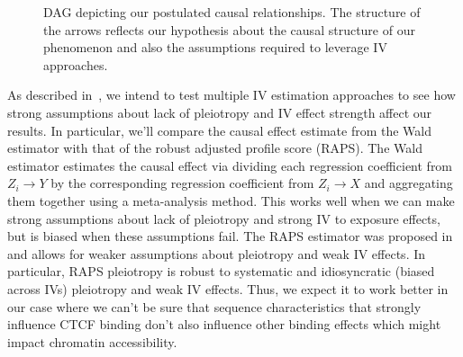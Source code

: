 \documentclass{article}
\begin{document}
\begin{figure}[ht]

    \caption{DAG depicting our postulated causal relationships. The structure of the arrows reflects our hypothesis about the causal structure of our phenomenon and also the assumptions required to leverage IV approaches.}
    \label{fig:mr_iv_dag}
\end{figure}

As described in~\cite{zhao2018statistical}, we intend to test multiple IV estimation approaches to see how strong assumptions about lack of pleiotropy and IV effect strength affect our results. In particular, we'll compare the causal effect estimate from the Wald estimator with that of the robust adjusted profile score (RAPS). The Wald estimator estimates the causal effect via dividing each regression coefficient from \( Z_i \rightarrow Y \) by the corresponding regression coefficient from \( Z_i \rightarrow X \) and aggregating them together using a meta-analysis method. This works well when we can make strong assumptions about lack of pleiotropy and strong IV to exposure effects, but is biased when these assumptions fail. The RAPS estimator was proposed in~\cite{zhao2018statistical} and allows for weaker assumptions about pleiotropy and weak IV effects. In particular, RAPS pleiotropy is robust to systematic and idiosyncratic (biased across IVs) pleiotropy and weak IV effects. Thus, we expect it to work better in our case where we can't be sure that sequence characteristics that strongly influence CTCF binding don't also influence other binding effects which might impact chromatin accessibility.
\end{document}
